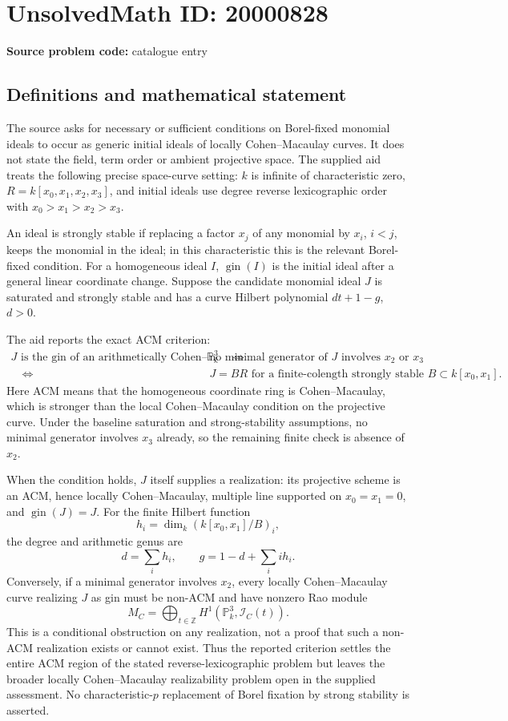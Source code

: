 \documentclass[11pt]{article}
\newcommand{\Z}{\mathbb{Z}}
\newcommand{\PP}{\mathbb{P}}
\begin{document}
\section*{UnsolvedMath ID: 20000828}
\textbf{Source problem code:} catalogue entry
\subsection{Definitions and mathematical statement}
The source asks for necessary or sufficient conditions on Borel-fixed monomial ideals to occur as generic initial ideals of locally Cohen--Macaulay curves. It does not state the field, term order or ambient projective space. The supplied aid treats the following precise space-curve setting: $k$ is infinite of characteristic zero, $R=k[x_0,x_1,x_2,x_3]$, and initial ideals use degree reverse lexicographic order with $x_0>x_1>x_2>x_3$.

An ideal is strongly stable if replacing a factor $x_j$ of any monomial by $x_i$, $i<j$, keeps the monomial in the ideal; in this characteristic this is the relevant Borel-fixed condition. For a homogeneous ideal $I$, $\operatorname{gin}(I)$ is the initial ideal after a general linear coordinate change. Suppose the candidate monomial ideal $J$ is saturated and strongly stable and has a curve Hilbert polynomial $dt+1-g$, $d>0$.

The aid reports the exact ACM criterion:
\[
 \begin{aligned}
 J\text{ is the gin of an arithmetically Cohen--Macaulay curve in }\PP^3_k
 \quad\Longleftrightarrow\quad
 &\text{no minimal generator of }J\text{ involves }x_2\text{ or }x_3\\
 \quad\Longleftrightarrow\quad
 &J=B R\text{ for a finite-colength strongly stable }B\subset k[x_0,x_1].
 \end{aligned}
\]
Here ACM means that the homogeneous coordinate ring is Cohen--Macaulay, which is stronger than the local Cohen--Macaulay condition on the projective curve. Under the baseline saturation and strong-stability assumptions, no minimal generator involves $x_3$ already, so the remaining finite check is absence of $x_2$.

When the condition holds, $J$ itself supplies a realization: its projective scheme is an ACM, hence locally Cohen--Macaulay, multiple line supported on $x_0=x_1=0$, and $\operatorname{gin}(J)=J$. For the finite Hilbert function
\[
 h_i=\dim_k(k[x_0,x_1]/B)_i,
\]
the degree and arithmetic genus are
\[
 d=\sum_i h_i,\qquad g=1-d+\sum_i i h_i.
\]
Conversely, if a minimal generator involves $x_2$, every locally Cohen--Macaulay curve realizing $J$ as gin must be non-ACM and have nonzero Rao module
\[
 M_C=\bigoplus_{t\in\Z}H^1(\PP^3_k,\mathcal I_C(t)).
\]
This is a conditional obstruction on any realization, not a proof that such a non-ACM realization exists or cannot exist. Thus the reported criterion settles the entire ACM region of the stated reverse-lexicographic problem but leaves the broader locally Cohen--Macaulay realizability problem open in the supplied assessment. No characteristic-$p$ replacement of Borel fixation by strong stability is asserted.
\end{document}
